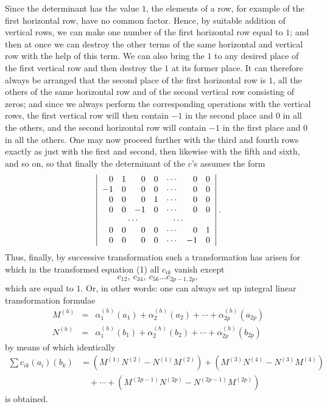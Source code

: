 \documentclass[10pt]{article}
\begin{document}
Since the determinant has the value \(1\), the elements of a row, for example of the first horizontal row, have no common factor. Hence, by suitable addition of vertical rows, we can make one number of the first horizontal row equal to \(1\); and then at once we can destroy the other terms of the same horizontal and vertical row with the help of this term. We can also bring the \(1\) to any desired place of the first vertical row and then destroy the \(1\) at its former place. It can therefore always be arranged that the second place of the first horizontal row is \(1\), all the others of the same horizontal row and of the second vertical row consisting of zeros; and since we always perform the corresponding operations with the vertical rows, the first vertical row will then contain \(-1\) in the second place and \(0\) in all the others, and the second horizontal row will contain \(-1\) in the first place and \(0\) in all the others. One may now proceed further with the third and fourth rows exactly as just with the first and second, then likewise with the fifth and sixth, and so on, so that finally the determinant of the \(c\)'s assumes the form
\[
\left|\begin{array}{rrrrrrr}
0&1&0&0&\cdots&0&0\\
-1&0&0&0&\cdots&0&0\\
0&0&0&1&\cdots&0&0\\
0&0&-1&0&\cdots&0&0\\
\multicolumn{7}{c}{\cdots\qquad\qquad\cdots}\\
0&0&0&0&\cdots&0&1\\
0&0&0&0&\cdots&-1&0
\end{array}\right|.
\]
Thus, finally, by successive transformation such a transformation has arisen for which in the transformed equation (1) all \(c_{ik}\) vanish except
\[
c_{12},\ c_{34},\ c_{56}\ldots c_{2p-1,2p},
\]
which are equal to \(1\). Or, in other words: one can always set up integral linear transformation formulae
\[
\begin{array}{rcl}
M^{(h)}&=&\alpha_1^{(h)}(a_1)+\alpha_2^{(h)}(a_2)+\cdots+\alpha_{2p}^{(h)}(a_{2p})\\
N^{(h)}&=&\alpha_1^{(h)}(b_1)+\alpha_2^{(h)}(b_2)+\cdots+\alpha_{2p}^{(h)}(b_{2p})
\end{array}
\]
by means of which identically
\[
\begin{split}
\sum c_{ik}(a_i)(b_k)
&=(M^{(1)}N^{(2)}-N^{(1)}M^{(2)})+(M^{(3)}N^{(4)}-N^{(3)}M^{(4)})\\
&\quad+\cdots+(M^{(2p-1)}N^{(2p)}-N^{(2p-1)}M^{(2p)})
\end{split}
\]
is obtained.
\end{document}
